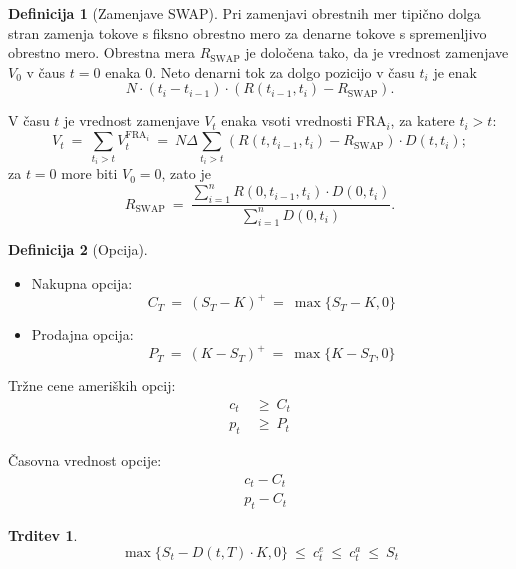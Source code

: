\documentclass[11pt]{article}
\newcommand{\1}{\mathbbm{1}}
\theoremstyle{definition}
\newtheorem{definicija}{Definicija}[section]
\theoremstyle{definition}
\newtheorem{trditev}{Trditev}[section]
\begin{document}
\begin{definicija}[Zamenjave SWAP]

Pri zamenjavi obrestnih mer tipično dolga stran zamenja tokove s fiksno obrestno mero za denarne tokove s spremenljivo obrestno mero. Obrestna mera $R_{\text{SWAP}}$ je določena tako, da je vrednost zamenjave $V_0$ v čaus $t = 0$ enaka $0$. Neto denarni tok za dolgo pozicijo v času $t_i$ je enak 
$$N \cdot (t_i - t_{i-1}) \cdot (R(t_{i-1}, t_i) - R_{\text{SWAP}}).$$

V času $t$ je vrednost zamenjave $V_t$ enaka vsoti vrednosti FRA$_i$, za katere $t_i > t$:
$$V_t ~=~ \sum_{t_i>t} V_t^{\text{FRA}_i} ~=~ N \Delta \sum_{t_i > t} (R(t, t_{i-1}, t_i) - R_{\text{SWAP}}) \cdot D(t, t_i);$$
za $t=0$ more biti $V_0 = 0$, zato je
$$R_\text{SWAP} ~=~ \frac{\sum_{i=1}^n R(0, t_{i-1}, t_i) \cdot D(0, t_i)}{\sum_{i=1}^n D(0, t_i)}.$$

\end{definicija}
\vspace{0.5cm}

\begin{definicija}[Opcija]
~\\
\begin{itemize}
	
	\item Nakupna opcija:
	$$C_T ~=~ (S_T - K)^+ ~=~ \max{\{ S_T - K, 0 \}}$$
	
	\item Prodajna opcija:
	$$P_T ~=~ (K - S_T)^+ ~=~ \max{\{ K - S_T, 0 \}}$$
	
\end{itemize}

Tržne cene ameriških opcij:
\begin{align*}
c_t ~&\geq~ C_t \\
p_t ~&\geq~ P_t
\end{align*}

Časovna vrednost opcije:
\begin{align*}
&c_t - C_t \\
&p_t - C_t
\end{align*}

\end{definicija}
\vspace{0.5cm}

\begin{trditev}

$$\max{\{ S_t - D(t, T) \cdot K, 0\}} ~\leq~ c_t^e ~\leq~ c_t^a ~\leq~ S_t$$

\end{trditev}
\vspace{0.5cm}
\end{document}
